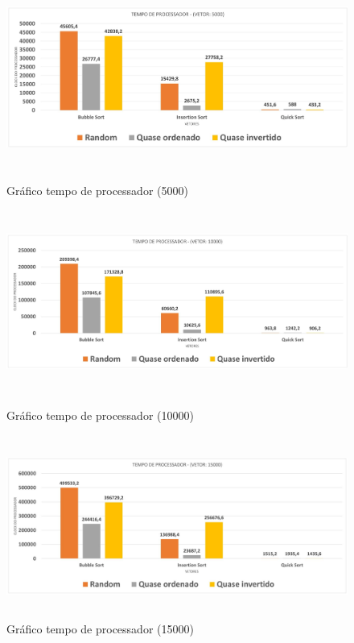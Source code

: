 \documentclass[12pt]{article}
\begin{document}
\begin{figure}[!htb]
     \centering
     \includegraphics[width=15cm, height=6cm]{graficos/tempo_de_processador_random5-1.jpg}
     \caption{Gráfico tempo de processador (5000)}
     \label{T5}

     \centering
     \includegraphics[width=15cm, height=6cm]{graficos/tempo_de_processador_random10-1.jpg}
     \caption{Gráfico tempo de processador (10000)}
     \label{T10}

     \centering
     \includegraphics[width=15cm, height=6cm]{graficos/tempo_de_processador_random15-1.jpg}
     \caption{Gráfico tempo de processador (15000)}
     \label{T15}
\end{figure}

	
\end{document}
